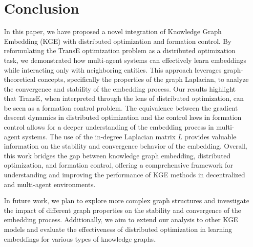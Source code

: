 \documentclass[letterpaper, 10 pt, conference]{ieeeconf}  %
\begin{document}

\section{Conclusion}
In this paper, we have proposed a novel integration of Knowledge Graph Embedding (KGE) with distributed optimization and formation control. 
By reformulating the TransE optimization problem as a distributed optimization task, we demonstrated how multi-agent systems can effectively learn embeddings while interacting only with neighboring entities. 
This approach leverages graph-theoretical concepts, specifically the properties of the graph Laplacian, to analyze the convergence and stability of the embedding process.
Our results highlight that TransE, when interpreted through the lens of distributed optimization, can be seen as a formation control problem. 
The equivalence between the gradient descent dynamics in distributed optimization and the control laws in formation control allows for a deeper understanding of the embedding process in multi-agent systems.
The use of the in-degree Laplacian matrix \(L\) provides valuable information on the stability and convergence behavior of the embedding.
Overall, this work bridges the gap between knowledge graph embedding, distributed optimization, and formation control, offering a comprehensive framework for understanding and improving the performance of KGE methods in decentralized and multi-agent environments.

In future work, we plan to explore more complex graph structures and investigate the impact of different graph properties on the stability and convergence of the embedding process. Additionally, we aim to extend our analysis to other KGE models and evaluate the effectiveness of distributed optimization in learning embeddings for various types of knowledge graphs.




\end{document}
